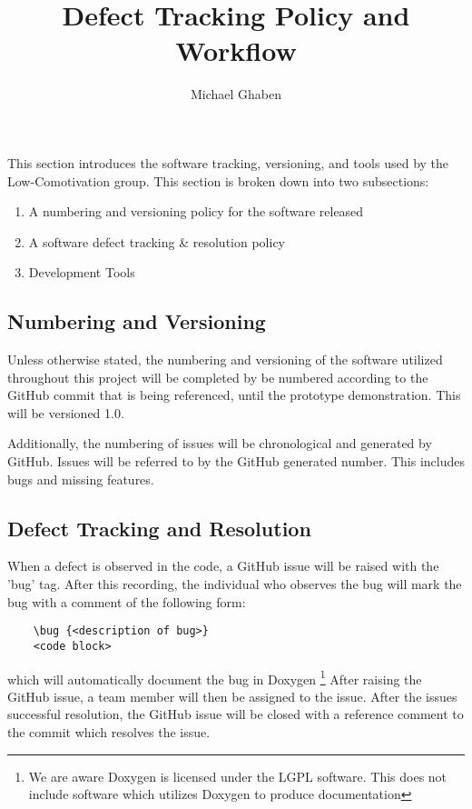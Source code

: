 \documentclass[]{article}
\title{Defect Tracking Policy and Workflow}
\author{Michael Ghaben}
\begin{document}
\maketitle

This section introduces the software tracking, versioning, and tools used by the Low-Comotivation group. This section is broken down into two subsections: 
\begin{enumerate}
	\item A numbering and versioning policy for the software released
	\item A software defect tracking  \& resolution policy 
	\item Development Tools
\end{enumerate}

\subsection{Numbering and Versioning}
Unless otherwise stated, the numbering and versioning of the software utilized throughout this project will be completed by be numbered according to the GitHub commit that is being referenced, until the prototype demonstration. This will be versioned 1.0.

Additionally, the numbering of issues will be chronological and generated by GitHub. Issues will be referred to by the GitHub generated number. This includes bugs and missing features.
\subsection{Defect Tracking and Resolution}
When a defect is observed in the code, a GitHub issue will be raised with the 'bug' tag. After this recording, the individual who observes the bug will mark the bug with a comment of the following form:

\begin{lstlisting}
	\bug {<description of bug>}
	<code block>
\end{lstlisting}

which will automatically document the bug in Doxygen \footnote{We are aware Doxygen is licensed under the LGPL software. This does not include software which utilizes Doxygen to produce documentation} After raising the GitHub issue, a team member will then be assigned to the issue. After the issues successful resolution, the GitHub issue will be closed with a reference comment to the commit which resolves the issue.
\end{document}
